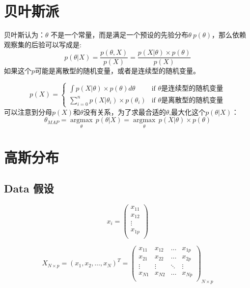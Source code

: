 \documentclass[withoutpreface,bwprint]{cumcmthesis} %
\begin{document}
\section{\Large 贝叶斯派}
	贝叶斯认为：$\theta$ 不是一个常量，而是满足一个预设的先验分布$\theta ~ p(\theta)$，那么依赖观察集的后验可以写成是:
		\begin{equation}
			p(\theta|X)=\dfrac{p(\theta,X)}{p(X)}=\dfrac{p(X|\theta) {\times} p(\theta)}{p(X)}
		\end{equation}
	如果这个$p$可能是离散型的随机变量，或者是连续型的随机变量。

		\[
		p(X)=\begin{cases}
			\int p(X|\theta){\times}p(\theta) d{\theta}	& \text{if } \theta \text{是连续型的随机变量} \\
			 \sum_{i=0}^n p(X|{\theta}_{i}){\times}p(\theta_{i}) & \text{if }  \theta \text{是离散型的随机变量}
		\end{cases}	
		\]
	可以注意到分母$p(X)$和$\theta$没有关系，为了求最合适的$\theta$,最大化这个$p(\theta|X)$：
	\begin{equation}
		\theta_{MAP}={\mathop{argmax}\limits_{\theta}} \,p(\theta|X)={\mathop{argmax}\limits_{\theta}}\, p(X|\theta) {\times} p(\theta)
	\end{equation}


	
	
\section{\Large 高斯分布}
	\subsection*{Data 假设}
		\begin{equation}
			x_i=\left(
				\begin{array}{c}
					x_{11} \\x_{12} \\ \vdots \\ x_{1p}\\
				\end{array}
			\right)
		\end{equation}
		\par
		\begin{equation}
			X_{N{\times}p} ={(x_1,x_2,\ldots,x_N)}^{T}=
			\left(
			\begin{array}{cccc}
				x_{11} & x_{12} & \ldots & x_{1p}\\
				x_{21} & x_{22} & \ldots & x_{2p}\\
				\vdots & \vdots & \ddots & \vdots\\
				x_{N1} & x_{N2} & \ldots & x_{Np}\\
			\end{array}
			\right)_{N{\times}p}
		\end{equation}
		
\end{document}
